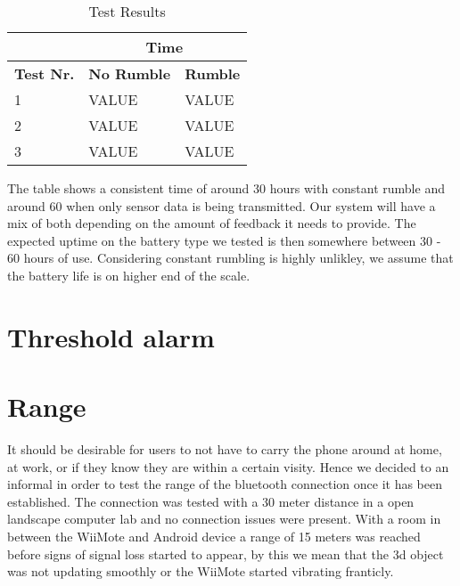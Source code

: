 \begin{table}[h]
\centering
\setlength{\extrarowheight}{0,2cm}
\begin{tabular}{p{2cm}|p{4.75cm}|p{4.75cm}|}
\cline{2-3}
&\multicolumn{2}{c|}{\textbf{Time}}\\ \hline
\textbf{Test Nr.} &\textbf{No Rumble} & \textbf{Rumble} \\ \hline
1 & VALUE & VALUE \\ \hline
2 & VALUE & VALUE \\ \hline
3 & VALUE & VALUE \\ \hline
\end{tabular}
\caption{Test Results}
\label{}
\end{table}

The table shows a consistent time of around 30 hours with constant rumble and around 60 when only sensor data is being transmitted. Our system will have a mix of both depending on the amount of feedback it needs to provide. The expected uptime on the battery type we tested is then somewhere between 30 - 60 hours of use. Considering constant rumbling is highly unlikley, we assume that the battery life is on higher end of the scale.

\section{Threshold alarm}


\section{Range}
It should be desirable for users to not have to carry the phone around at home, at work, or if they know they are within a certain visity. Hence we decided to an informal in order to test the range of the bluetooth connection once it has been established. The connection was tested with a 30 meter distance in a open landscape computer lab and no connection issues were present. With a room in between the WiiMote and Android device a range of 15 meters was reached before signs of signal loss started to appear, by this we mean that the 3d object was not updating smoothly or the WiiMote started vibrating franticly.